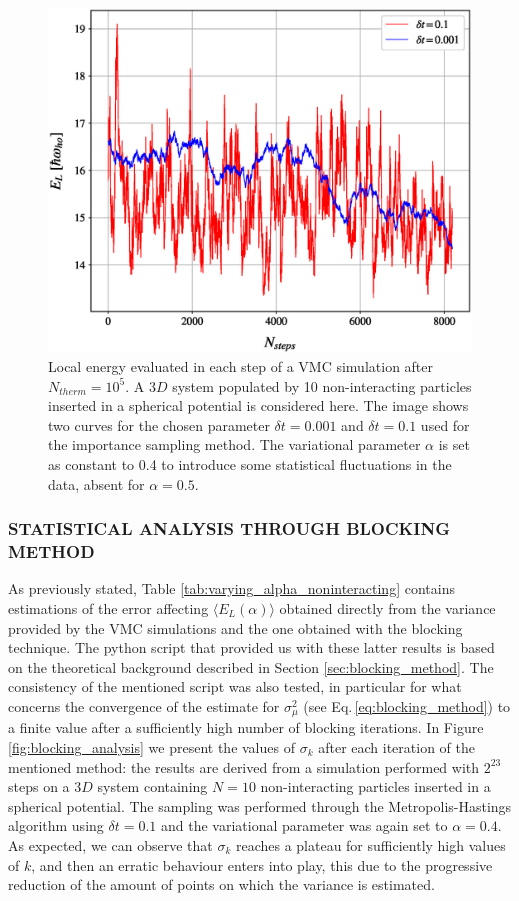 \begin{figure}[H]
    \centering
    \includegraphics[scale=0.37]{images/correlation_different_deltat.eps}
    \caption{Local energy evaluated in each step of a VMC simulation after $N_{therm}=10^5$. A $3D$ system populated by 10 non-interacting particles inserted in a spherical potential is considered here. The image shows two curves for the chosen parameter $\delta t=0.001$ and $\delta t = 0.1$ used for the importance sampling method. The variational parameter $\alpha$ is set as constant to 0.4 to introduce some statistical fluctuations in the data, absent for $\alpha=0.5$. }
    \label{fig:correlation_varying_dt}
\end{figure}


\subsubsection{STATISTICAL ANALYSIS THROUGH BLOCKING METHOD}
As previously stated, Table \ref{tab:varying_alpha_noninteracting} contains estimations of the error affecting $\langle E_L(\alpha) \rangle$ obtained directly from the variance provided by the VMC simulations and the one obtained with the blocking technique. The python script that provided us with these latter results is based on the theoretical background described in Section \ref{sec:blocking_method}. The consistency of the mentioned script was also tested, in particular for what concerns the convergence of the estimate for  $\sigma_\mu^2$ (see Eq.\,\ref{eq:blocking_method}) to a finite value after a sufficiently high number of blocking iterations. In Figure \ref{fig:blocking_analysis} we present the values of $\sigma_k$ after each iteration of the mentioned method: the results are derived from a simulation performed with $2^{23}$ steps on a $3D$ system containing $N=10$ non-interacting particles inserted in a spherical potential. The sampling was performed through the Metropolis-Hastings algorithm using $\delta t=0.1$ and the variational parameter was again set to $\alpha=0.4$. As expected, we can observe that $\sigma_k$ reaches a plateau for sufficiently high values of $k$, and then an erratic behaviour enters into play, this due to the progressive reduction of the amount of points on which the variance is estimated. 

